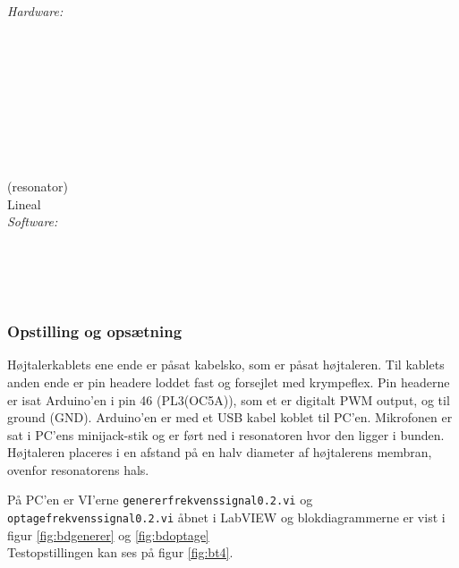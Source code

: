 {		\textit{Hardware:}\\
		\tores\\
		\\
		\kabelsko\\
		\pins\\
		\krympeflex\\
		\arduino\\
		\mikrofon\\
		\PC\\
		\usbkabel\\
		 (resonator)\\
		Lineal\\
	
		\textit{Software:}\\
		\labview\\
		\visa\\
		\vi\\
		\ardsw\\
		
		
		\subsubsection{Opstilling og opsætning}
		
		Højtalerkablets ene ende er påsat kabelsko, som er påsat højtaleren. Til kablets anden ende er pin headere loddet fast og forsejlet med krympeflex. Pin headerne er isat Arduino'en i pin 46 (PL3(OC5A)), som et er digitalt PWM output, og til ground (GND). 
		Arduino'en er med et USB kabel koblet til PC'en.	
		Mikrofonen er sat i PC'ens minijack-stik og er ført ned i resonatoren hvor den ligger i bunden. Højtaleren placeres i en afstand på en halv diameter af højtalerens membran, ovenfor resonatorens hals. 
		
		På PC'en er VI'erne \texttt{genererfrekvenssignal0.2.vi} og \texttt{optagefrekvenssignal0.2.vi} åbnet i LabVIEW og blokdiagrammerne er vist i figur \ref{fig:bdgenerer} og \ref{fig:bdoptage} \\ Testopstillingen kan ses på figur \ref{fig:bt4}.  
		
}

